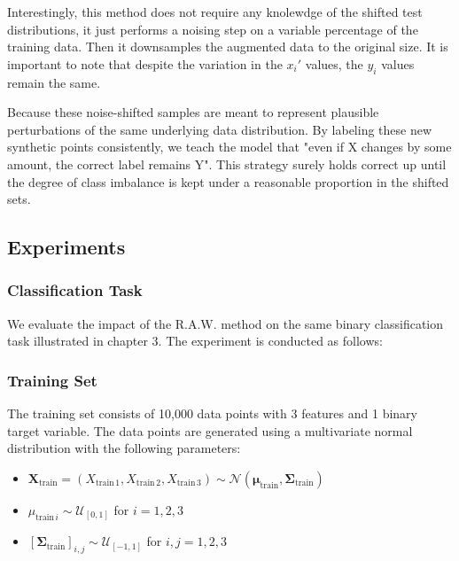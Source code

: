 Interestingly, this method does not require any knolewdge of the shifted test distributions, it just performs a noising step on a variable percentage of the training data. Then it downsamples the augmented data to the original size.
It is important to note that despite the variation in the $x_i'$ values, the $y_i$ values remain the same.

\begin{tcolorbox}[colback=gray!5,colframe=gray!40,title= Why Keep the Same Label?]
    Because these noise-shifted samples are meant to represent plausible perturbations of the same underlying data distribution. By labeling these new synthetic points consistently, we teach the model that "even if X changes by some amount, the correct label remains Y". This strategy surely holds correct up until the degree of class imbalance is kept under a reasonable proportion in the shifted sets.
\end{tcolorbox}





\subsection{Experiments}
\subsubsection{\textbf{Classification Task}}

We evaluate the impact of the R.A.W. method on the same binary classification task illustrated in chapter 3. The experiment is conducted as follows:
\subsubsection{Training Set}
The training set consists of 10,000 data points with 3 features and 1 binary target variable. The data points are generated using a multivariate normal distribution with the following parameters:

\begin{itemize}
    \item $ \boldsymbol{X}_{\text{train}} = (X_{\text{train}\,1}, X_{\text{train}\,2}, X_{\text{train}\,3}) \sim \mathcal{N}(\boldsymbol{\mu}_{\text{train}}, \boldsymbol{\Sigma}_{\text{train}}) $
    \item $ \mu_{\text{train}\,i} \sim \mathcal{U}_{[0,1]} $ for $ i = 1, 2, 3 $
    \item $ [\boldsymbol{\Sigma}_{\text{train}}]_{i,j} \sim \mathcal{U}_{[-1,1]} $ for $ i, j = 1, 2, 3 $
\end{itemize}

